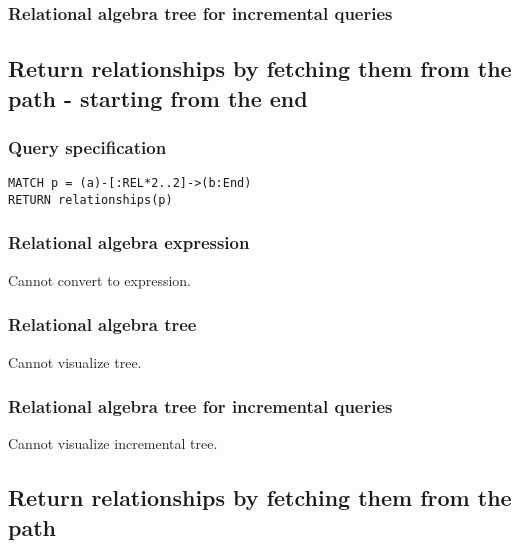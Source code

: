\subsubsection*{Relational algebra tree for incremental queries}


\subsection{Return relationships by fetching them from the path - starting from the end}

\subsubsection*{Query specification}

\begin{lstlisting}
MATCH p = (a)-[:REL*2..2]->(b:End)
RETURN relationships(p)
\end{lstlisting}

\subsubsection*{Relational algebra expression}

Cannot convert to expression.

\subsubsection*{Relational algebra tree}

Cannot visualize tree.

\subsubsection*{Relational algebra tree for incremental queries}

Cannot visualize incremental tree.

\subsection{Return relationships by fetching them from the path}

